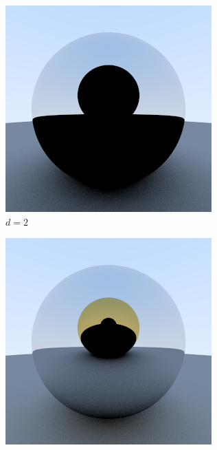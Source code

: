 \documentclass[10pt]{IEEEtran}
\begin{document}
\begin{figure}
\begin{subfigure}[b]{0.2\textwidth}
        \centering
        \includegraphics[width=\textwidth]{images/recursiveDepth/2.png}
        \caption{$d=2$}
        \label{fig:recursion d equals 2}
    \end{subfigure}
    \begin{subfigure}[b]{0.2\textwidth}
        \centering
        \includegraphics[width=\textwidth]{images/recursiveDepth/3.png}

\end{subfigure}
\end{figure}
\end{document}
